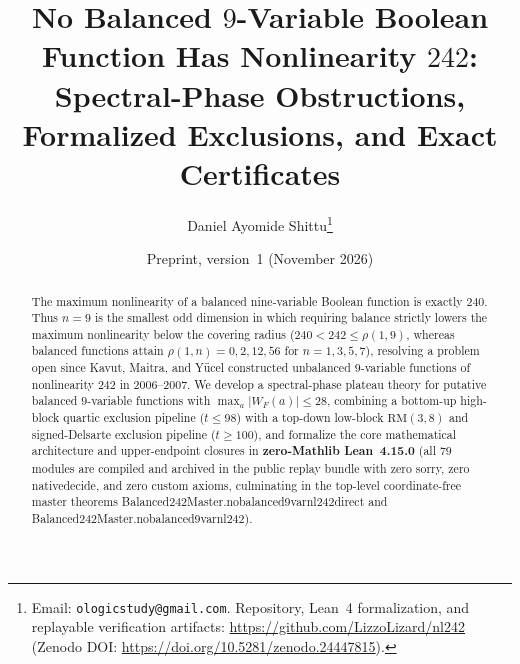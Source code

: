 \documentclass[11pt]{article}
\title{No Balanced $9$-Variable Boolean Function Has Nonlinearity $242$:\\
Spectral-Phase Obstructions, Formalized Exclusions, and Exact Certificates}
\author{Daniel Ayomide Shittu\thanks{Email: \texttt{ologicstudy@gmail.com}. Repository, Lean~4 formalization, and replayable verification artifacts: \url{https://github.com/LizzoLizard/nl242} (Zenodo DOI: \url{https://doi.org/10.5281/zenodo.24447815}).}}
\date{Preprint, version~1 (November 2026)}
\theoremstyle{definition}
\newcommand{\code}[1]{{\ttfamily\small\renewcommand{\_}{\textunderscore\allowbreak}#1}}
\begin{document}
\maketitle

\begin{abstract}
The maximum nonlinearity of a balanced nine-variable Boolean function is exactly $240$.
Thus $n = 9$ is the smallest odd dimension in which requiring balance strictly lowers the maximum nonlinearity below the covering radius ($240 < 242 \le \rho(1,9)$, whereas balanced functions attain $\rho(1,n) = 0, 2, 12, 56$ for $n = 1, 3, 5, 7$), resolving a problem open since Kavut, Maitra, and Y\"ucel constructed unbalanced $9$-variable functions of nonlinearity $242$ in 2006--2007.
We develop a spectral-phase plateau theory for putative balanced $9$-variable functions with $\max_a |W_F(a)| \le 28$, combining a bottom-up high-block quartic exclusion pipeline ($t \le 98$) with a top-down low-block $\mathrm{RM}(3,8)$ and signed-Delsarte exclusion pipeline ($t \ge 100$), and formalize the core mathematical architecture and upper-endpoint closures in \textbf{zero-Mathlib Lean~4.15.0} (all 79 modules are compiled and archived in the public replay bundle with zero \code{sorry}, zero \code{native\_decide}, and zero custom axioms, culminating in the top-level coordinate-free master theorems \code{Balanced242Master.\allowbreak no\_balanced\_9var\_nl242\_direct} and \code{Balanced242Master.\allowbreak no\_balanced\_9var\_nl242}).


\end{abstract}
\end{document}

